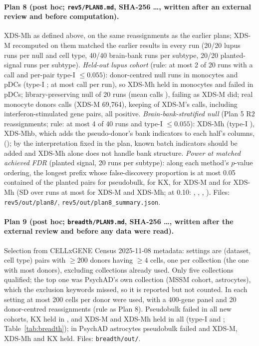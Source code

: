 \paragraph{Plan 8 (post hoc; \texttt{rev5/PLAN8.md}, SHA-256 \PeSha\ldots, written after an external review and before computation).} XDS-Mh as defined above, on the same reassignments as the earlier plans; XDS-M recomputed on them matched the earlier results in every run (20/20 lupus runs per null and cell type, 40/40 brain-bank runs per subtype, 20/20 planted-signal runs per subtype). \emph{Held-out lupus cohort} (rule: at most 2 of 20 runs with a call and per-pair type-I $\le0.055$): donor-centred null \PeLAh{} runs in monocytes and pDCs (type-I \PeLAhtI; at most \PeLAhFCmax{} call per run), so XDS-Mh held in monocytes and failed in pDCs; library-preserving null \PeLDh{} of 20 runs (mean calls \PeLDhMean), failing as XDS-M did; real monocyte donors \PeLRh{} calls (XDS-M 69{,}764), keeping \PeLRkeep{} of XDS-M's calls, including \PeLRisg{} interferon-stimulated gene pairs, all positive. \emph{Brain-bank-stratified null} (Plan 5 R2 reassignments; rule: at most 4 of 40 runs and type-I $\le0.055$): XDS-Mh \PeBh{} (type-I \PeBhtI), XDS-Mhb, which adds the pseudo-donor's bank indicators to each half's columns, \PeBhb{} (\PeBhbtI); by the interpretation fixed in the plan, known batch indicators should be added and XDS-Mh alone does not handle bank structure. \emph{Power at matched achieved FDR} (planted signal, 20 runs per subtype): along each method's $p$-value ordering, the longest prefix whose false-discovery proportion is at most 0.05 contained \PeMatchPB{} of the planted pairs for pseudobulk, \PeMatchKX{} for KX, \PeMatchXlist{} for XDS-M and \PeMatchHlist{} for XDS-Mh (SD over runs at most \PeMatchSDmax{} for XDS-M and XDS-Mh; at 0.10: \PeMatchTenPB, \PeMatchTenKX, \PeMatchTenX, \PeMatchTenH). Files: \texttt{rev5/out/plan8/}, \texttt{rev5/out/plan8\_summary.json}.

\paragraph{Plan 9 (post hoc; \texttt{breadth/PLAN9.md}, SHA-256 \BrSha\ldots, written after the external review and before any data were read).} Selection from CELLxGENE Census 2025-11-08 metadata: settings are (dataset, cell type) pairs with $\ge200$ donors having $\ge4$ cells, one per collection (the one with most donors), excluding collections already used. Only five collections qualified; the top one was PsychAD's own collection (MSSM cohort, astrocytes), which the exclusion keywords missed, so it is reported but not counted. In each setting at most 200 cells per donor were used, with a 400-gene panel and 20 donor-centred reassignments (rule as Plan 8). Pseudobulk failed in all \BrN{} new cohorts, KX held in \BrKXheld, and XDS-M and XDS-Mh held in all \BrN{} (type-I \BrXtI{} and \BrHtI; Table~\ref{tab:breadth}); in PsychAD astrocytes pseudobulk failed and XDS-M, XDS-Mh and KX held. Files: \texttt{breadth/out/}.

